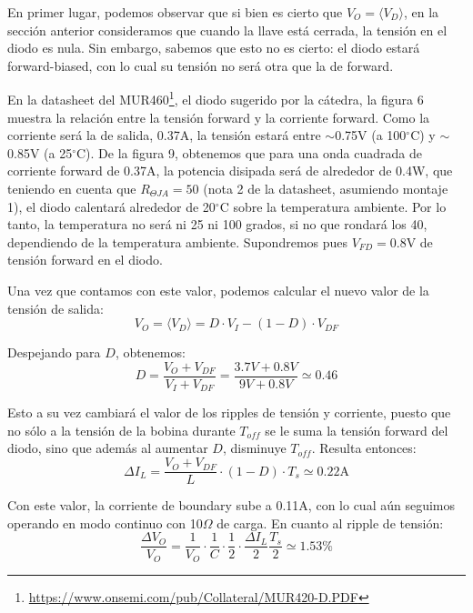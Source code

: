 \documentclass[e4_tp1_main.tex]{subfiles}
\begin{document}
En primer lugar, podemos observar que si bien es cierto que $V_O = \langle V_D \rangle$, en la secci\'on anterior consideramos que cuando la llave est\'a cerrada, la tensi\'on en el diodo es nula. Sin embargo, sabemos que esto no es cierto: el diodo estar\'a forward-biased, con lo cual su tensi\'on no ser\'a otra que la de forward. 

En la datasheet del 
MUR460\footnote{
	\url{https://www.onsemi.com/pub/Collateral/MUR420-D.PDF}
}, el diodo sugerido por la c\'atedra, la figura 6 muestra la relaci\'on entre la tensi\'on forward y la corriente forward. Como la corriente ser\'a la de salida, 0.37A, la tensi\'on estar\'a entre $\sim$0.75V (a 100$^\circ$C) y 
$\sim$0.85V (a 25$^\circ$C). 
De la figura 9, obtenemos que para una onda cuadrada de corriente forward de 0.37A, la potencia disipada ser\'a de alrededor de 0.4W, que teniendo en cuenta que $R_{\Theta JA}=50$ (nota 2 de la datasheet, asumiendo montaje 1), el diodo calentar\'a alrededor de 20$^\circ$C sobre la temperatura ambiente. Por lo tanto, la temperatura no ser\'a ni 25 ni 100 grados, si no que rondar\'a los 40, dependiendo de la temperatura ambiente. Supondremos pues $V_{FD}= 0.8$V de tensi\'on forward en el diodo.

Una vez que contamos con este valor, podemos calcular el nuevo valor de la tensi\'on de salida: 
\begin{equation}
	V_O = \langle V_D \rangle = D \cdot V_I - (1-D) \cdot V_{DF}   
\end{equation}

Despejando para $D$, obtenemos:
\begin{equation}
	D = \frac{V_O + V_{DF}}{V_I + V_{DF}} 
	= \frac{3.7V + 0.8V}{9V + 0.8V} 
	\simeq 0.46 
\end{equation}

Esto a su vez cambiar\'a el valor de los ripples de tensi\'on y corriente, puesto que no s\'olo a la tensi\'on de la bobina durante $T_{off}$ se le suma la tensi\'on forward del diodo, sino que adem\'as al aumentar $D$, disminuye $T_{off}$. Resulta entonces: 
\begin{equation}
	\Delta I_L = \frac{V_O + V_{DF}}{L} \cdot (1-D) \cdot T_s
	\simeq 0.22\text{A}
\end{equation} 

Con este valor, la corriente de boundary sube a 0.11A, con lo cual a\'un seguimos operando en modo continuo con 10$\Omega$ de carga. En cuanto al ripple de tensi\'on:
\begin{equation}
\frac{\Delta V_O}{V_O}  
= \frac{1}{V_O} 
\cdot \frac{1}{C} \cdot \frac{1}{2} \cdot \frac{\Delta I_L}{2} \frac{T_s}{2}
\simeq 1.53 \%
\end{equation}
\end{document}
